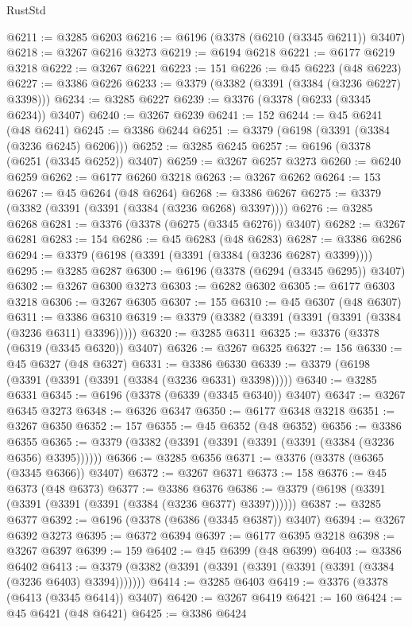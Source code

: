 \begin{lexlean}{RustStd}
\begin{coremodule}
{\begin{coremodule}
{{{{{{{{{{{{{{{{{{{{{{{{{{{{{{{{{{{{{{{@6211 := @3285 @6203
@6216 := @6196 (@3378 (@6210 (@3345 @6211)) @3407)
@6218 := @3267 @6216 @3273
@6219 := @6194 @6218
@6221 := @6177 @6219 @3218
@6222 := @3267 @6221
@6223 := 151
@6226 := @45 @6223 (@48 @6223)
@6227 := @3386 @6226
@6233 := @3379 (@3382 (@3391 (@3384 (@3236 @6227) @3398)))
@6234 := @3285 @6227
@6239 := @3376 (@3378 (@6233 (@3345 @6234)) @3407)
@6240 := @3267 @6239
@6241 := 152
@6244 := @45 @6241 (@48 @6241)
@6245 := @3386 @6244
@6251 := @3379 (@6198 (@3391 (@3384 (@3236 @6245) @6206)))
@6252 := @3285 @6245
@6257 := @6196 (@3378 (@6251 (@3345 @6252)) @3407)
@6259 := @3267 @6257 @3273
@6260 := @6240 @6259
@6262 := @6177 @6260 @3218
@6263 := @3267 @6262
@6264 := 153
@6267 := @45 @6264 (@48 @6264)
@6268 := @3386 @6267
@6275 := @3379 (@3382 (@3391 (@3391 (@3384 (@3236 @6268) @3397))))
@6276 := @3285 @6268
@6281 := @3376 (@3378 (@6275 (@3345 @6276)) @3407)
@6282 := @3267 @6281
@6283 := 154
@6286 := @45 @6283 (@48 @6283)
@6287 := @3386 @6286
@6294 := @3379 (@6198 (@3391 (@3391 (@3384 (@3236 @6287) @3399))))
@6295 := @3285 @6287
@6300 := @6196 (@3378 (@6294 (@3345 @6295)) @3407)
@6302 := @3267 @6300 @3273
@6303 := @6282 @6302
@6305 := @6177 @6303 @3218
@6306 := @3267 @6305
@6307 := 155
@6310 := @45 @6307 (@48 @6307)
@6311 := @3386 @6310
@6319 := @3379 (@3382 (@3391 (@3391 (@3391 (@3384 (@3236 @6311) @3396)))))
@6320 := @3285 @6311
@6325 := @3376 (@3378 (@6319 (@3345 @6320)) @3407)
@6326 := @3267 @6325
@6327 := 156
@6330 := @45 @6327 (@48 @6327)
@6331 := @3386 @6330
@6339 := @3379 (@6198 (@3391 (@3391 (@3391 (@3384 (@3236 @6331) @3398)))))
@6340 := @3285 @6331
@6345 := @6196 (@3378 (@6339 (@3345 @6340)) @3407)
@6347 := @3267 @6345 @3273
@6348 := @6326 @6347
@6350 := @6177 @6348 @3218
@6351 := @3267 @6350
@6352 := 157
@6355 := @45 @6352 (@48 @6352)
@6356 := @3386 @6355
@6365 := @3379 (@3382 (@3391 (@3391 (@3391 (@3391 (@3384 (@3236 @6356) @3395))))))
@6366 := @3285 @6356
@6371 := @3376 (@3378 (@6365 (@3345 @6366)) @3407)
@6372 := @3267 @6371
@6373 := 158
@6376 := @45 @6373 (@48 @6373)
@6377 := @3386 @6376
@6386 := @3379 (@6198 (@3391 (@3391 (@3391 (@3391 (@3384 (@3236 @6377) @3397))))))
@6387 := @3285 @6377
@6392 := @6196 (@3378 (@6386 (@3345 @6387)) @3407)
@6394 := @3267 @6392 @3273
@6395 := @6372 @6394
@6397 := @6177 @6395 @3218
@6398 := @3267 @6397
@6399 := 159
@6402 := @45 @6399 (@48 @6399)
@6403 := @3386 @6402
@6413 := @3379 (@3382 (@3391 (@3391 (@3391 (@3391 (@3391 (@3384 (@3236 @6403) @3394)))))))
@6414 := @3285 @6403
@6419 := @3376 (@3378 (@6413 (@3345 @6414)) @3407)
@6420 := @3267 @6419
@6421 := 160
@6424 := @45 @6421 (@48 @6421)
@6425 := @3386 @6424
}}}}}}}}}}}}}}}}}}}}}}}}}}}}}}}}}}}}}}}
\end{coremodule}}
\end{coremodule}
\end{lexlean}
